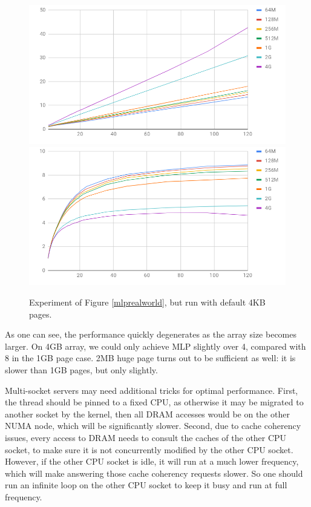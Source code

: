 \documentclass[11pt, usletter]{article}
\begin{document}
\begin{figure}[!htb]
  \includegraphics[width=\linewidth]{equivalentCost_4k.png}
\endminipage\hfill
{}
  \includegraphics[width=\linewidth]{equivalentMLP_4k.png}
\endminipage\hfill
\caption{Experiment of Figure \ref{mlprealworld}, but run with default 4KB pages.}
\label{mlp_4kb}
\end{figure}

As one can see, the performance quickly degenerates as the array size becomes larger. 
On 4GB array, we could only achieve MLP slightly over 4, compared with 8 in the 1GB page case. 
2MB huge page turns out to be sufficient as well: it is slower than 1GB pages, but only slightly.

Multi-socket servers may need additional tricks for optimal performance.
First, the thread should be pinned to a fixed CPU, as otherwise it may be migrated to another socket 
by the kernel, then all DRAM accesses would be on the other NUMA node, which will be significantly slower. 
Second, due to cache coherency issues, every access to DRAM needs to consult the caches of the other CPU socket, 
to make sure it is not concurrently modified by the other CPU socket. 
However, if the other CPU socket is idle, it will run at a much lower frequency, 
which will make answering those cache coherency requests slower. 
So one should run an infinite loop on the other CPU socket to keep it busy and run at full frequency. 
\end{document}
